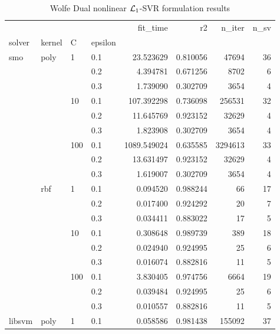 \begin{table}[H]
\centering
\caption{Wolfe Dual nonlinear $\protect \mathcal{L}_1$-SVR formulation results}
\label{nonlinear_dual_l1_svr_cv_results}
\begin{tabular}{llllrrrr}
\toprule
       &     &     &     &     fit\_time &        r2 &    n\_iter &  n\_sv \\
solver & kernel & C & epsilon &              &           &           &       \\
\midrule
smo & poly & 1   & 0.1 &    23.523629 &  0.810056 &     47694 &    36 \\
       &     &     & 0.2 &     4.394781 &  0.671256 &      8702 &     6 \\
       &     &     & 0.3 &     1.739090 &  0.302709 &      3654 &     4 \\
       &     & 10  & 0.1 &   107.392298 &  0.736098 &    256531 &    32 \\
       &     &     & 0.2 &    11.645769 &  0.923152 &     32629 &     4 \\
       &     &     & 0.3 &     1.823908 &  0.302709 &      3654 &     4 \\
       &     & 100 & 0.1 &  1089.549024 &  0.635585 &   3294613 &    33 \\
       &     &     & 0.2 &    13.631497 &  0.923152 &     32629 &     4 \\
       &     &     & 0.3 &     1.619007 &  0.302709 &      3654 &     4 \\
       & rbf & 1   & 0.1 &     0.094520 &  0.988244 &        66 &    17 \\
       &     &     & 0.2 &     0.017400 &  0.924292 &        20 &     7 \\
       &     &     & 0.3 &     0.034411 &  0.883022 &        17 &     5 \\
       &     & 10  & 0.1 &     0.308648 &  0.989739 &       389 &    18 \\
       &     &     & 0.2 &     0.024940 &  0.924995 &        25 &     6 \\
       &     &     & 0.3 &     0.016074 &  0.882816 &        11 &     5 \\
       &     & 100 & 0.1 &     3.830405 &  0.974756 &      6664 &    19 \\
       &     &     & 0.2 &     0.039484 &  0.924995 &        25 &     6 \\
       &     &     & 0.3 &     0.010557 &  0.882816 &        11 &     5 \\
libsvm & poly & 1   & 0.1 &     0.058586 &  0.981438 &    155092 &    37 \\

\end{tabular}
\end{table}
